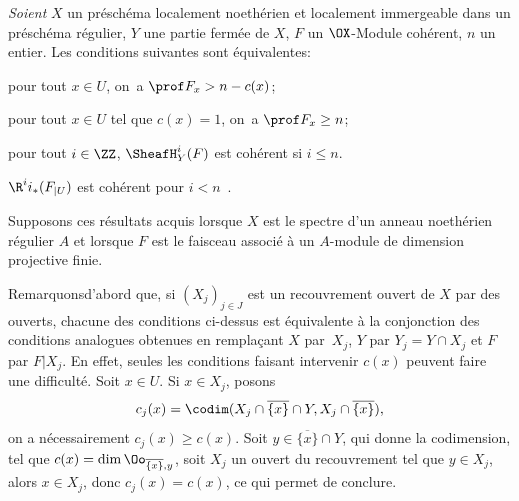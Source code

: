 \begin{corollaire} \label{VIII.2.3} \emph{Soient} $X$ un pr\'esch\'ema localement noeth\'erien et localement immergeable dans un pr\'esch\'ema r\'egulier, $Y$ une partie ferm\'ee de $X$, $F$ un $\OX$-Module coh\'erent, $n$ un entier. Les conditions suivantes sont \'equivalentes:
\begin{enumeratei}
\item
pour tout $x\in U$, on~a $\prof F_x>n-c(x)$;
\item
pour tout $x\in U$ tel que $c(x)=1$, on~a $\prof F_x\geq n$;
\item
pour tout $i\in \ZZ$, $\SheafH^i_Y(F)$ est coh\'erent si $i\leq n$.
\item
$\R^ii_\ast(F_{|U})$ est coh\'erent pour $i<n$\ .
\end{enumeratei}
\end{corollaire}

Supposons ces r\'esultats acquis lorsque $X$ est le spectre d'un anneau noeth\'erien r\'egulier $A$ et lorsque $F$ est le faisceau associ\'e \`a un $A$-module de dimension projective finie.

Remarquons\pageoriginaled d'abord que, si $(X_j)_{j\in
J}$ est un recouvrement ouvert de $X$ par des ouverts, chacune des conditions
ci-dessus est \'equivalente \`a la conjonction des conditions
analogues obtenues en rempla\c cant $X$ par~$X_j$, $Y$ par
$Y_j=Y\cap X_j$ et $F$ par
$F{|X_j}$. En effet, seules les conditions
faisant intervenir $c(x)$ peuvent faire une difficult\'e. Soit $x\in
U$. Si $x\in X_j$, posons
\[
c_j(x)=\codim(X_j\cap \overline{\{x\}}\cap Y, X_j\cap\overline{\{x\}}),
\]
on a n\'ecessairement $c_j(x)\geq c(x)$. Soit $y\in
\overline{\{x\}}\cap Y$, qui \og donne la codimension\fg, \ie tel
que $c(x)=\dim \Oo_{\overline{\{x\}}, y}$, soit $X_j$ un ouvert du
recouvrement tel que $y\in X_j$, alors $x\in X_j$, donc
$c_j(x)=c(x)$, ce qui permet de conclure.

